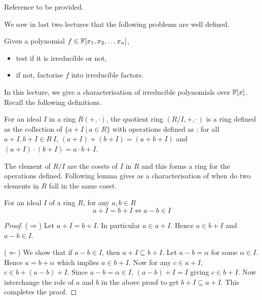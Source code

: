 Reference to be provided.


We saw in last two lectures that the following problems are well defined.
\begin{problem}
	Given a polynomial $f \in {\mathbb{F}[x_1,x_2, \ldots x_n]}$, 
	\begin{itemize}
		\item test if it is irreducible or not,
		\item if not, factorise $f$ into irreducible factors.
	\end{itemize}
\end{problem}

In this lecture, we give a characterisation of irreducible polynomials over
${\mathbb{F}}[x]$. Recall the following definitions.

\begin{definition}
	For an ideal $I$ in a ring $R(+,\cdot)$, the quotient ring $(R/I, +
	,\cdot)$ is a ring defined as the collection of $\{a+I ~|~ a \in R\}$
	with operations defined as : for all $a+I, b+I \in R \ I$,
	$(a+I)+(b+I) = (a+b+ I)$ and $(a+I) \cdot (b+I) = a\cdot b+I$.
\end{definition}
The element of $R/I$ are the cosets of $I$ in $R$ and this forms a ring for
the operations defined.  Following lemma gives as a characterisation of when
do two elements in $R$ fall in the same coset.
\begin{lemma} \label{lem:mem-ideal}
	For an ideal $I$ of a ring $R$, for any $a,b \in R$ 
	\[ a+I = b + I \iff a-b \in I \]
\end{lemma}
\begin{proof}
	($\Longrightarrow$) Let $a+I = b+I$. In particular $a \in a+I$. Hence
	$a \in b+I$ and $a-b \in I$.

	($\Longleftarrow$) We show that if $a-b \in I$, then $a+I \subseteq
	b+I$. Let $a-b = \alpha$ for some $\alpha \in I$. Hence $a = b +
	\alpha$ which implies $a \in b+I$. Now for any $c \in a+I$, $c \in
	b+(a-b)+I$. Since $a-b = \alpha \in I$, $(a-b)+I = I$ giving $c \in
	b+I$. Now interchange the role of $a$ and $b$ in the above proof to
	get $b+I \subseteq a+I$. This completes the proof.
\end{proof}

